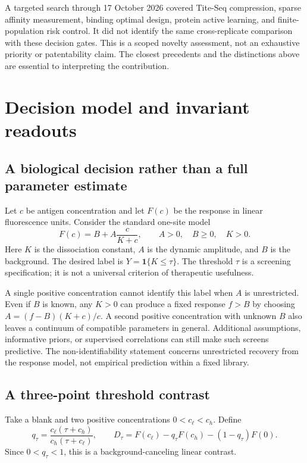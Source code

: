 \documentclass[11pt,letterpaper]{article}
\newcommand{\ind}{\mathbf 1}
\begin{document}
A targeted search through 17 October 2026 covered Tite-Seq compression, sparse affinity measurement, binding optimal design, protein active learning, and finite-population risk control. It did not identify the same cross-replicate comparison with these decision gates. This is a scoped novelty assessment, not an exhaustive priority or patentability claim. The closest precedents and the distinctions above are essential to interpreting the contribution.

\section{Decision model and invariant readouts}
\subsection{A biological decision rather than a full parameter estimate}
Let $c$ be antigen concentration and let $F(c)$ be the response in linear fluorescence units. Consider the standard one-site model
\begin{equation}
 F(c)=B+A\frac{c}{K+c},\qquad A>0,\quad B\geq0,\quad K>0.
 \label{eq:binding}
\end{equation}
Here $K$ is the dissociation constant, $A$ is the dynamic amplitude, and $B$ is the background. The desired label is $Y=\ind\{K\leq\tau\}$. The threshold $\tau$ is a screening specification; it is not a universal criterion of therapeutic usefulness.

A single positive concentration cannot identify this label when $A$ is unrestricted. Even if $B$ is known, any $K>0$ can produce a fixed response $f>B$ by choosing $A=(f-B)(K+c)/c$. A second positive concentration with unknown $B$ also leaves a continuum of compatible parameters in general. Additional assumptions, informative priors, or supervised correlations can still make such screens predictive. The non-identifiability statement concerns unrestricted recovery from the response model, not empirical prediction within a fixed library.

\subsection{A three-point threshold contrast}
Take a blank and two positive concentrations $0<c_\ell<c_h$. Define
\begin{equation}
 q_\tau=\frac{c_\ell(\tau+c_h)}{c_h(\tau+c_\ell)},\qquad
 D_\tau=F(c_\ell)-q_\tau F(c_h)-(1-q_\tau)F(0).
 \label{eq:contrast}
\end{equation}
Since $0<q_\tau<1$, this is a background-canceling linear contrast.
\end{document}
